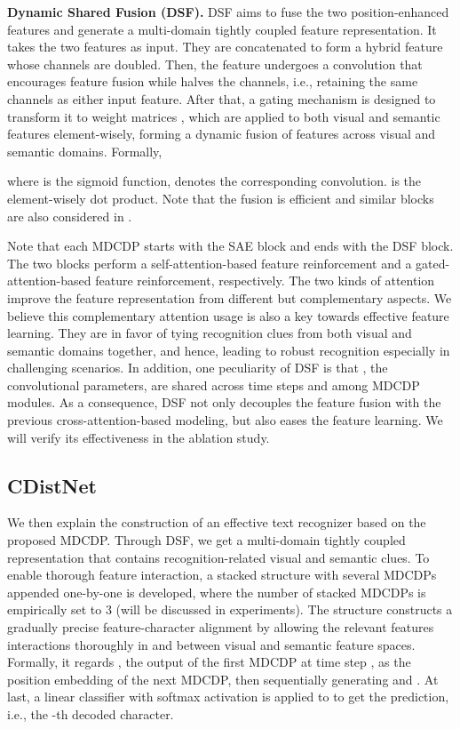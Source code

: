 \noindent\textbf{Dynamic Shared Fusion (DSF).}
DSF aims to fuse the two position-enhanced features and generate a multi-domain tightly coupled feature representation. It takes the two features as input. They are concatenated to form a hybrid feature whose channels are doubled. Then, the feature undergoes a  convolution that encourages feature fusion while halves the channels, i.e., retaining the same channels as either input feature. After that, a gating mechanism is designed to transform it to weight matrices , which are applied to both visual and semantic features element-wisely, forming a dynamic fusion of features across visual and semantic domains. Formally,

where  is the sigmoid function,  denotes the corresponding convolution.  is the element-wisely dot product. Note that the fusion is efficient and similar blocks are also considered in \citep{ABInet21CVPR,SRNyu2020towards}.


Note that each MDCDP starts with the SAE block and ends with the DSF block. The two blocks perform a self-attention-based feature reinforcement and a gated-attention-based feature reinforcement, respectively. The two kinds of attention improve the feature representation from different but complementary aspects. We believe this complementary attention usage is also a key towards effective feature learning. They are in favor of tying recognition clues from both visual and semantic domains together, and hence, leading to robust recognition especially in challenging scenarios. In addition, one peculiarity of DSF is that , the convolutional parameters, are shared across time steps and among MDCDP modules. As a consequence, DSF not only decouples the feature fusion with the previous cross-attention-based modeling, but also eases the feature learning. We will verify its effectiveness in the ablation study.

\subsection{CDistNet}
We then explain the construction of an effective text recognizer based on the proposed MDCDP. Through DSF, we get a multi-domain tightly coupled representation that contains recognition-related visual and semantic clues. To enable thorough feature interaction, a stacked structure with several MDCDPs appended one-by-one is developed, where the number of stacked MDCDPs is empirically set to 3 (will be discussed in experiments). The structure constructs a gradually precise feature-character alignment by allowing the relevant features interactions thoroughly in and between visual and semantic feature spaces. Formally, it regards , the output of the first MDCDP at time step , as the position embedding of the next MDCDP, then sequentially generating  and . At last, a linear classifier with softmax activation is applied to  to get the prediction, i.e., the -th decoded character.

